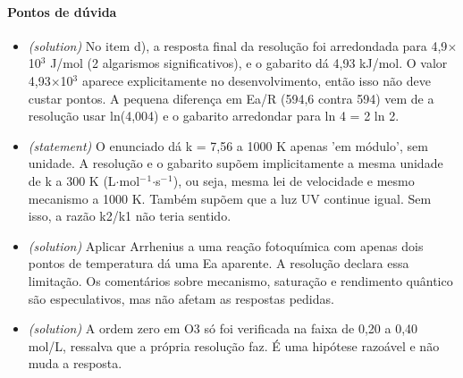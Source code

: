 \documentclass{article}%
\begin{document}
\paragraph{Pontos de dúvida}%
\begin{itemize}%
\item%
\textit{(solution)} No item d), a resposta final da resolução foi arredondada para 4,9$\times$10$^3$ J/mol (2 algarismos significativos), e o gabarito dá 4,93 kJ/mol. O valor 4,93$\times$10$^3$ aparece explicitamente no desenvolvimento, então isso não deve custar pontos. A pequena diferença em Ea/R (594,6 contra 594) vem de a resolução usar ln(4,004) e o gabarito arredondar para ln 4 = 2 ln 2.%
\item%
\textit{(statement)} O enunciado dá k = 7,56 a 1000 K apenas 'em módulo', sem unidade. A resolução e o gabarito supõem implicitamente a mesma unidade de k a 300 K (L$\cdot$mol$^{-}$$^{1}$$\cdot$s$^{-}$$^{1}$), ou seja, mesma lei de velocidade e mesmo mecanismo a 1000 K. Também supõem que a luz UV continue igual. Sem isso, a razão k2/k1 não teria sentido.%
\item%
\textit{(solution)} Aplicar Arrhenius a uma reação fotoquímica com apenas dois pontos de temperatura dá uma Ea aparente. A resolução declara essa limitação. Os comentários sobre mecanismo, saturação e rendimento quântico são especulativos, mas não afetam as respostas pedidas.%
\item%
\textit{(solution)} A ordem zero em O3 só foi verificada na faixa de 0,20 a 0,40 mol/L, ressalva que a própria resolução faz. É uma hipótese razoável e não muda a resposta.%
\end{itemize}%
\end{document}
